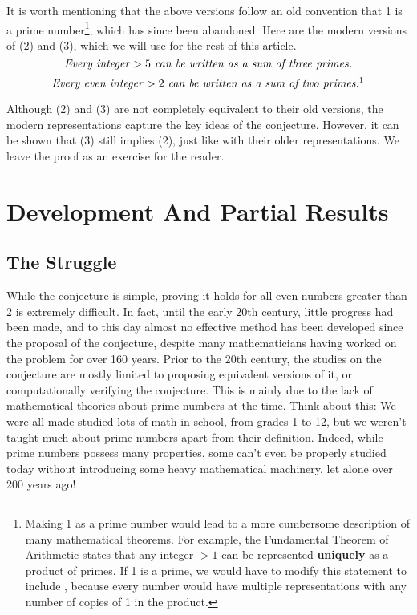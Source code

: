 \documentclass{article}
\begin{document}
It is worth mentioning that the above versions follow an old convention that 1 is a prime number\footnote{Making 1 as a prime number would lead to a more cumbersome description of many mathematical theorems. For example, the Fundamental Theorem of Arithmetic states that any integer $> 1$ can be represented \textbf{uniquely} as a product of primes. If 1 is a prime, we would have to modify this statement to include , because every number would have multiple representations with any number of copies of 1 in the product.}, which has since been abandoned. Here are the modern versions of (2) and (3), which we will use for the rest of this article.
\setcounter{equation}{1}
\begin{equation}
    \emph{Every integer $> 5$ can be written as a sum of three primes.}
\end{equation}
\begin{equation}
    \emph{Every even integer $> 2$ can be written as a sum of two primes.\footnotemark{}}
\end{equation}

Although (2) and (3) are not completely equivalent to their old versions, the modern representations capture the key ideas of the conjecture. However, it can be shown that (3) still implies (2), just like with their older representations. We leave the proof as an exercise for the reader.
\section*{Development And Partial Results}
\subsection*{The Struggle}
While the conjecture is simple, proving it holds for all even numbers greater than 2 is extremely difficult. In fact, until the early 20th century, little progress had been made, and to this day almost no effective method has been developed since the proposal of the conjecture, despite many mathematicians having worked on the problem for over 160 years. Prior to the 20th century, the studies on the conjecture are mostly limited to proposing equivalent versions of it, or computationally verifying the conjecture\cite{wang}. This is mainly due to the lack of mathematical theories about prime numbers at the time\cite{wang}. Think about this: We were all made studied lots of math in school, from grades 1 to 12, but we weren't taught much about prime numbers apart from their definition. Indeed, while prime numbers possess many properties, some can't even be properly studied today without introducing some heavy mathematical machinery, let alone over 200 years ago!
\end{document}
